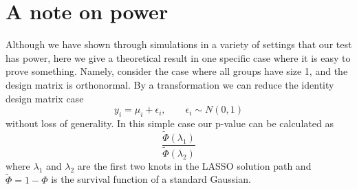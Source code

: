 \documentclass{imsart}
\newcommand{\norm}[1]{\lVert #1 \rVert}
\begin{document}


\section{A note on power}
\label{app:power}

Although we have shown through simulations in a variety of settings that
our test has power, here we give a theoretical result in one specific case
where it is easy to prove something. Namely, consider the case where all
groups have size 1, and the design matrix is orthonormal. By a
transformation we can reduce the identity design matrix case
\[
y_i = \mu_i + \epsilon_i, \qquad \epsilon_i \sim N(0,1)
\]
without loss of generality. In this simple case our p-value can be
calculated as
\[
\frac{\tilde \Phi(\lambda_1)}{\tilde \Phi(\lambda_2)}
\]
where $\lambda_1$ and $\lambda_2$ are the first two knots in the LASSO
solution path and $\tilde \Phi = 1 - \Phi$ is the survival function of
a standard Gaussian. 
\end{document}
